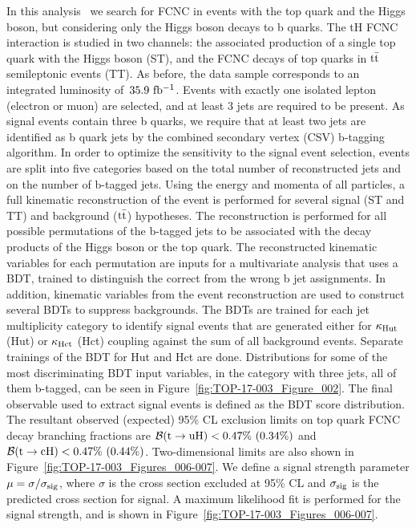 \documentclass{PoS}
\begin{document}
In this analysis~\cite{top-17-003} we search for FCNC in events with the
top quark and the Higgs boson, but considering only the Higgs boson decays to b
quarks. The tH FCNC interaction is studied in two channels: the associated
production of a single top quark with the Higgs boson (ST), and the FCNC decays
of top quarks in ${\rm t{\bar t}}$ semileptonic events (TT). As before, the data
sample corresponds to an integrated luminosity of~${\rm 35.9~fb^{-1}}$. Events
with exactly one isolated lepton (electron or muon) are selected, and at least
3 jets are required to be present. As signal events contain three b quarks,
we require that at least two jets are identified as b quark jets by the combined
secondary vertex (CSV) b-tagging algorithm. In order to optimize the sensitivity
to the signal event selection, events are split into five categories based on
the total number of reconstructed jets and on the number of b-tagged jets.
Using the energy and momenta of all particles, a full kinematic reconstruction
of the event is performed for several signal (ST and TT) and background
(${\rm t{\bar t}}$) hypotheses. The reconstruction is performed for all possible
permutations of the b-tagged jets to be associated with the decay products of
the Higgs boson or the top quark. The reconstructed kinematic variables for each
permutation are inputs for a multivariate analysis that uses a BDT, trained
to distinguish the correct from the wrong b jet assignments. In addition,
kinematic variables from the event reconstruction are used to construct several
BDTs to suppress backgrounds. The BDTs are trained for each jet multiplicity
category to identify signal events that are generated either for
${\rm \kappa_{Hut}}$ (Hut) or ${\rm \kappa_{Hct}}$ (Hct) coupling against the
sum of all background events. Separate trainings of the BDT for Hut and Hct are
done. Distributions for some of the most discriminating BDT input variables,
in the category with three jets, all of them b-tagged, can be seen in
Figure~\ref{fig:TOP-17-003_Figure_002}. The final observable used to extract
signal events is defined as the BDT score distribution. The resultant observed
(expected) 95\% CL exclusion limits on top quark FCNC decay branching fractions
are ${\cal B}({\rm t \to uH}) < 0.47\%~(0.34\%)$ and
${\cal B}({\rm t \to cH}) < 0.47\%~(0.44\%)$. Two-dimensional limits are also
shown in Figure~\ref{fig:TOP-17-003_Figures_006-007}. We define a signal strength
parameter $\mu = \sigma/\sigma_{\rm sig}$, where $\sigma$ is the cross section
excluded at 95\% CL and $\sigma_{\rm sig}$ is the predicted cross section for
signal. A maximum likelihood fit is performed for the signal strength, and is
shown in Figure~\ref{fig:TOP-17-003_Figures_006-007}.
\end{document}
